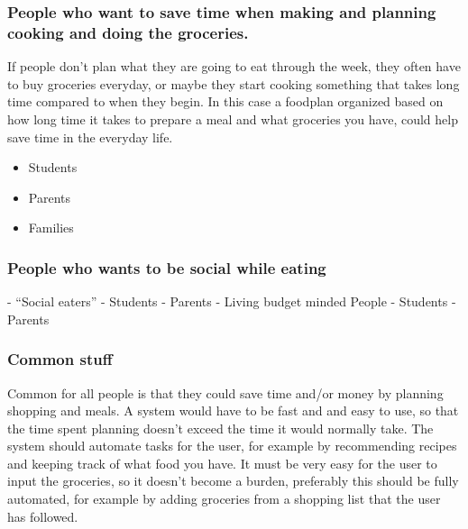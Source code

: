 \subsubsection{People who want to save time when making and planning cooking and doing the groceries.} 
If people don't plan what they are going to eat through the week, they often have to buy groceries everyday, or maybe they start cooking something that takes long time compared to when they begin. In this case a foodplan organized based on how long time it takes to prepare a meal and what groceries you have, could help save time in the everyday life.
\begin{itemize}
\item Students
\item Parents
\item Families
\end{itemize}

\subsubsection{People who wants to be social while eating}
- “Social eaters”
- Students
- Parents
- Living budget minded People
- Students
- Parents

\subsubsection{Common stuff}
Common for all people is that they could save time and/or money by planning shopping and meals. A system would have to be fast and and easy to use, so that the time spent planning doesn't exceed the time it would normally take. The system should automate tasks for the user, for example by recommending recipes and keeping track of what food you have. It must be very easy for the user to input the groceries, so it doesn't become a burden, preferably this should be fully automated, for example by adding groceries from a shopping list that the user has followed.

